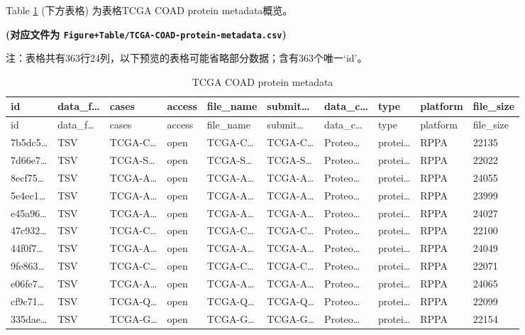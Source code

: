 \documentclass[
]{article}
\begin{document}
Table \ref{tab:TCGA-COAD-protein-metadata} (下方表格) 为表格TCGA COAD protein metadata概览。

\textbf{(对应文件为 \texttt{Figure+Table/TCGA-COAD-protein-metadata.csv})}

\begin{center}\begin{tcolorbox}[colback=gray!10, colframe=gray!50, width=0.9\linewidth, arc=1mm, boxrule=0.5pt]注：表格共有363行24列，以下预览的表格可能省略部分数据；含有363个唯一`id'。
\end{tcolorbox}
\end{center}

\begin{longtable}[]{@{}llllllllll@{}}
\caption{\label{tab:TCGA-COAD-protein-metadata}TCGA COAD protein metadata}\tabularnewline
\toprule
id & data\_f\ldots{} & cases & access & file\_name & submit\ldots{} & data\_c\ldots{} & type & platform & file\_size\tabularnewline
\midrule
\endfirsthead
\toprule
id & data\_f\ldots{} & cases & access & file\_name & submit\ldots{} & data\_c\ldots{} & type & platform & file\_size\tabularnewline
\midrule
\endhead
7b5dc5\ldots{} & TSV & TCGA-C\ldots{} & open & TCGA-C\ldots{} & TCGA-C\ldots{} & Proteo\ldots{} & protei\ldots{} & RPPA & 22135\tabularnewline
7d66e7\ldots{} & TSV & TCGA-S\ldots{} & open & TCGA-S\ldots{} & TCGA-S\ldots{} & Proteo\ldots{} & protei\ldots{} & RPPA & 22022\tabularnewline
8ecf75\ldots{} & TSV & TCGA-A\ldots{} & open & TCGA-A\ldots{} & TCGA-A\ldots{} & Proteo\ldots{} & protei\ldots{} & RPPA & 24055\tabularnewline
5e4ec1\ldots{} & TSV & TCGA-A\ldots{} & open & TCGA-A\ldots{} & TCGA-A\ldots{} & Proteo\ldots{} & protei\ldots{} & RPPA & 23999\tabularnewline
e45a96\ldots{} & TSV & TCGA-A\ldots{} & open & TCGA-A\ldots{} & TCGA-A\ldots{} & Proteo\ldots{} & protei\ldots{} & RPPA & 24027\tabularnewline
47c932\ldots{} & TSV & TCGA-C\ldots{} & open & TCGA-C\ldots{} & TCGA-C\ldots{} & Proteo\ldots{} & protei\ldots{} & RPPA & 22100\tabularnewline
44f0f7\ldots{} & TSV & TCGA-A\ldots{} & open & TCGA-A\ldots{} & TCGA-A\ldots{} & Proteo\ldots{} & protei\ldots{} & RPPA & 24049\tabularnewline
9fe863\ldots{} & TSV & TCGA-C\ldots{} & open & TCGA-C\ldots{} & TCGA-C\ldots{} & Proteo\ldots{} & protei\ldots{} & RPPA & 22071\tabularnewline
e06fe7\ldots{} & TSV & TCGA-A\ldots{} & open & TCGA-A\ldots{} & TCGA-A\ldots{} & Proteo\ldots{} & protei\ldots{} & RPPA & 24065\tabularnewline
cf9c71\ldots{} & TSV & TCGA-Q\ldots{} & open & TCGA-Q\ldots{} & TCGA-Q\ldots{} & Proteo\ldots{} & protei\ldots{} & RPPA & 22099\tabularnewline
335dae\ldots{} & TSV & TCGA-G\ldots{} & open & TCGA-G\ldots{} & TCGA-G\ldots{} & Proteo\ldots{} & protei\ldots{} & RPPA & 22154\tabularnewline

\end{longtable}
\end{document}
